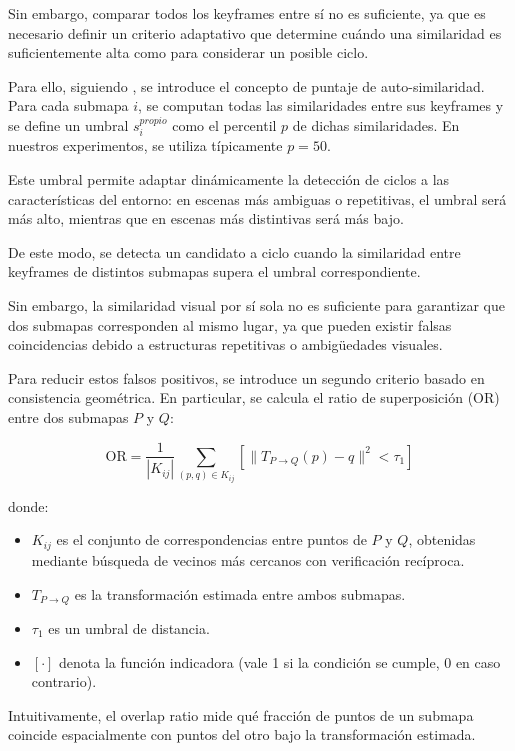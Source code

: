 Sin embargo, comparar todos los keyframes entre sí no es suficiente, ya que es necesario definir un criterio adaptativo que determine cuándo una similaridad es suficientemente alta como para considerar un posible ciclo.

Para ello, siguiendo \cite{zhu2025_loopsplat}, se introduce el concepto de puntaje de auto-similaridad. Para cada submapa $i$, se computan todas las similaridades entre sus keyframes y se define un umbral $s_i^{propio}$ como el percentil $p$ de dichas similaridades. En nuestros experimentos, se utiliza típicamente $p = 50$.

Este umbral permite adaptar dinámicamente la detección de ciclos a las características del entorno: en escenas más ambiguas o repetitivas, el umbral será más alto, mientras que en escenas más distintivas será más bajo.

De este modo, se detecta un candidato a ciclo cuando la similaridad entre keyframes de distintos submapas supera el umbral correspondiente.

Sin embargo, la similaridad visual por sí sola no es suficiente para garantizar que dos submapas corresponden al mismo lugar, ya que pueden existir falsas coincidencias debido a estructuras repetitivas o ambigüedades visuales.


Para reducir estos falsos positivos, se introduce un segundo criterio basado en consistencia geométrica. En particular, se calcula el ratio de superposición (OR) entre dos submapas $P$ y $Q$:

\[
\text{OR} = \frac{1}{|K_{ij}|} \sum_{(p,q)\in K_{ij}} \left[ \|T_{P \to Q}(p) - q\|^2 < \tau_1 \right]
\]

\noindent donde:
\begin{itemize}
    \item $K_{ij}$ es el conjunto de correspondencias entre puntos de $P$ y $Q$, obtenidas mediante búsqueda de vecinos más cercanos con verificación recíproca.
    \item $T_{P \to Q}$ es la transformación estimada entre ambos submapas.
    \item $\tau_1$ es un umbral de distancia.
    \item $[\cdot]$ denota la función indicadora (vale 1 si la condición se cumple, 0 en caso contrario).
\end{itemize}

Intuitivamente, el overlap ratio mide qué fracción de puntos de un submapa coincide espacialmente con puntos del otro bajo la transformación estimada.

